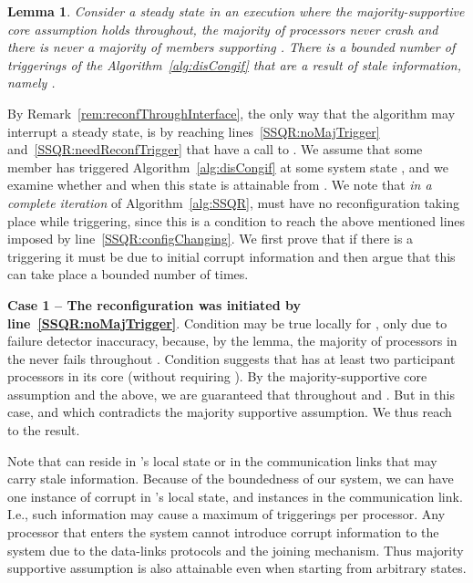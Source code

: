 \documentclass[11pt]{article}
\newcommand{\assert}{lemma}
\newtheorem{lemma}[theorem]{Lemma}
\newenvironment{proof}{\noindent{\bf Proof.}}{\hfill}
\begin{document}
\begin{lemma}
\label{thQ:noAbruptConfigTriggered}
Consider a steady  state  in an execution  where the majority-supportive core assumption holds throughout, the majority of  processors never crash and there is never a majority of members supporting . 
There is a bounded number of triggerings of the Algorithm~\ref{alg:disCongif} that are a result of stale information, namely  .
\end{lemma}

\begin{proof}
By Remark~\ref{rem:reconfThroughInterface}, the only way that the algorithm may interrupt a steady  state, is by reaching lines~\ref{SSQR:noMajTrigger} and~\ref{SSQR:needReconfTrigger} that have a call to .
We assume that some member  has triggered Algorithm~\ref{alg:disCongif} at some system state , and we examine whether and when this state is attainable from .
We note that \emph{in a complete iteration} of Algorithm~\ref{alg:SSQR},  must have no reconfiguration taking place while triggering, since this is a condition to reach the above mentioned lines imposed by line~\ref{SSQR:configChanging}.
We first prove that if there is a triggering it must be due to initial corrupt information and then argue that this can take place a bounded number of times.


\noindent \textbf{Case 1 -- The reconfiguration was initiated by line~\ref{SSQR:noMajTrigger}}. 
Condition   may be true locally for , only due to failure detector inaccuracy, because, by the \assert, the majority of processors in the  never fails throughout . 
Condition  suggests that  has at least two participant processors in its core (without requiring ). 
By the majority-supportive core assumption and the above, we are guaranteed that  throughout  and .
But in this case,  and  which contradicts the majority supportive assumption. 
We thus reach to the result.


Note that  can reside in 's local state or in the communication links that may carry stale information. 
Because of the boundedness of our system, we can have one instance of corrupt  in 's local state, and  instances in the communication link.
I.e., such information may cause a maximum of  triggerings per processor.
Any processor that enters the system cannot introduce corrupt information to the system due to the data-links protocols and the joining mechanism.
Thus majority supportive assumption is also attainable even when starting from arbitrary states.






\end{proof}
\end{document}
